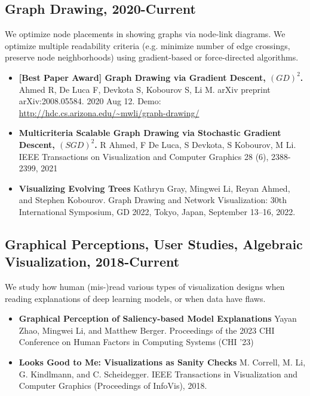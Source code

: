 \documentclass[letterpaper,11pt,oneside]{article}
\begin{document}
\subsection*{Graph Drawing, 2020-Current}
    We optimize node placements in showing graphs via node-link diagrams. We optimize multiple readability criteria (e.g. minimize number of edge crossings, preserve node neighborhoods) using gradient-based or force-directed algorithms. 
\begin{itemize}
    \item \textbf{[Best Paper Award] Graph Drawing via Gradient Descent, $(GD)^2$. }
        Ahmed R, De Luca F, Devkota S, Kobourov S, Li M. 
        arXiv preprint arXiv:2008.05584. 2020 Aug 12. Demo: \url{http://hdc.cs.arizona.edu/~mwli/graph-drawing/}

    \item \textbf{Multicriteria Scalable Graph Drawing via Stochastic Gradient Descent, $(SGD)^2$.}
        R Ahmed, F De Luca, S Devkota, S Kobourov, M Li. 
        IEEE Transactions on Visualization and Computer Graphics 28 (6), 2388-2399, 2021
    \item \textbf{Visualizing Evolving Trees}
        Kathryn Gray, Mingwei Li, Reyan Ahmed, and Stephen Kobourov. 
        Graph Drawing and Network Visualization: 30th International Symposium, GD 2022, Tokyo, Japan, September 13–16, 2022.

\end{itemize}

\subsection*{Graphical Perceptions, User Studies, Algebraic Visualization, 2018-Current}
    We study how human (mis-)read various types of visualization designs when reading explanations of deep learning models, or when data have flaws.
    \begin{itemize}
        \item \textbf{Graphical Perception of Saliency-based Model Explanations}
            Yayan Zhao, Mingwei Li, and Matthew Berger.
            Proceedings of the 2023 CHI Conference on Human Factors in Computing Systems (CHI '23)
        \item \textbf{Looks Good to Me: Visualizations as Sanity Checks}
            M. Correll, M. Li, G. Kindlmann, and C. Scheidegger. 
            IEEE Transactions in Visualization and Computer Graphics (Proceedings of InfoVis), 2018.
    \end{itemize}
\end{document}
